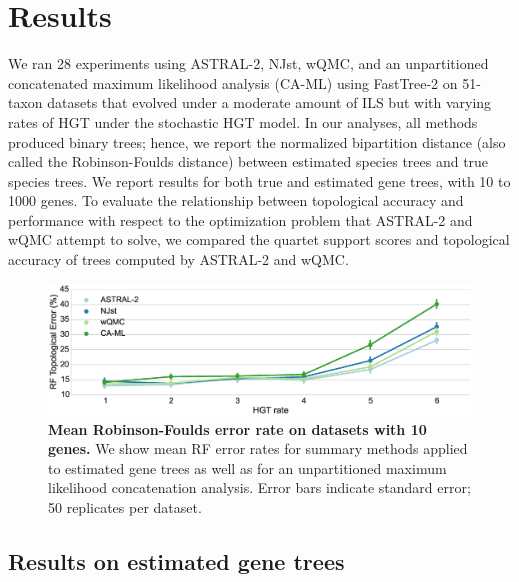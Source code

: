 \section{Results}

We ran 28 experiments using ASTRAL-2, NJst, wQMC, and an
unpartitioned concatenated
maximum likelihood analysis (CA-ML) using FastTree-2 
 on 51-taxon datasets that  evolved under a moderate amount of ILS but with varying rates of HGT   under the stochastic HGT model. 
In our analyses, all methods produced binary trees; hence,
we report the normalized bipartition distance (also called
the Robinson-Foulds \cite{RF} distance) between estimated
species trees and true species trees. 
We report results for both true and estimated gene trees, with  10 to 1000 genes.  
To evaluate the relationship between topological accuracy 
and performance with respect to the optimization problem that ASTRAL-2 and
wQMC attempt to solve, 
we compared the quartet support scores and topological accuracy of trees
computed by ASTRAL-2 and wQMC.

  \begin{figure}[h!]
\centering
\includegraphics[width=12cm]{hgt-figs/10-est.eps}
 \caption[Mean Robinson-Foulds error rate on 
datasets with 10 genes]{{\bf Mean Robinson-Foulds error rate on 
datasets with 10 genes. } We
show mean RF error rates for summary methods applied to
estimated gene trees as well as for an unpartitioned
maximum likelihood 
concatenation analysis. Error bars indicate standard error; 
50 replicates per dataset. 
}
\label{hgt::fig1}
      \end{figure}

\subsection{Results on estimated gene trees}

